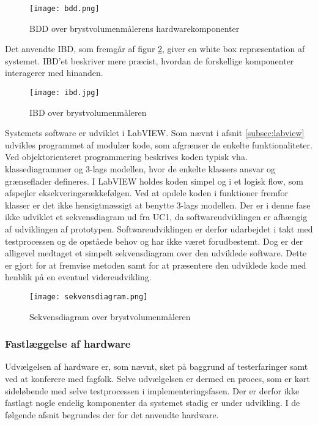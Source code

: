\begin{figure}[htb]
\centering
\texttt{[image: bdd.png]}
\caption{BDD over brystvolumenmålerens hardwarekomponenter}
\label{fig:bdd}
\end{figure}

Det anvendte IBD, som fremgår af figur \ref{fig:ibd}, giver en white box repræsentation af systemet. IBD'et beskriver mere præcist, hvordan de forskellige komponenter interagerer med hinanden. 

\begin{figure}[htb]
\centering
\texttt{[image: ibd.jpg]}
\caption{IBD over brystvolumenmåleren}
\label{fig:ibd}
\end{figure}

Systemets software er udviklet i LabVIEW. Som nævnt i afsnit \ref{subsec:labview} udvikles programmet af modulær kode, som afgrænser de enkelte funktionaliteter. Ved objektorienteret programmering beskrives koden typisk vha. klassediagrammer og 3-lags modellen, hvor de enkelte klassers ansvar og grænseflader defineres. I LabVIEW holdes koden simpel og i et logisk flow, som afspejler eksekveringsrækkefølgen. Ved at opdele koden i funktioner fremfor klasser er det ikke hensigtmæssigt at benytte 3-lags modellen. 
Der er i denne fase ikke udviklet et sekvensdiagram ud fra UC1, da softwareudviklingen er afhængig af udviklingen af prototypen. Softwareudviklingen er derfor udarbejdet i takt med testprocessen og de opståede behov og har ikke været forudbestemt. Dog er der alligevel medtaget et simpelt sekvensdiagram over den udviklede software. Dette er gjort for at fremvise metoden samt for at præsentere den udviklede kode med henblik på en eventuel videreudvikling.

\begin{figure}[htb]
\centering
\texttt{[image: sekvensdiagram.png]}
\caption{Sekvensdiagram over brystvolumenmåleren}
\label{fig:sekvens}
\end{figure}

\subsubsection{Fastlæggelse af hardware} 
Udvælgelsen af hardware er, som nævnt, sket på baggrund af testerfaringer samt ved at konferere med fagfolk. Selve udvælgelsen er dermed en proces, som er kørt sideløbende med selve testprocessen i implementeringsfasen. Der er derfor ikke fastlagt nogle endelig komponenter da systemet stadig er under udvikling. I de følgende afsnit begrundes der for det anvendte hardware. 


